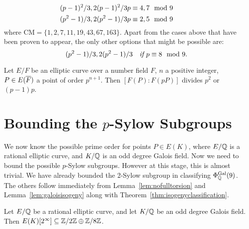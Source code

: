\begin{thm}
\begin{align}
	\pushleft{(p - 1)^2/3, 2(p - 1)^2/3} &  \pushright{p \equiv 4, 7 \mod 9 \quad\quad\quad} \label{12} \\
	\pushleft{(p^2 - 1)/3, 2(p^2 - 1)/3} &  \pushright{p \equiv 2, 5 \mod 9 \quad\quad\quad} \label{13}
	\end{align}
where $\text{CM}= \{ 1, 2, 7, 11, 19, 43, 67, 163 \}$. Apart from the cases above that have been proven to appear, the only other options that might be possible are:
	\begin{equation} \label{14}
	(p^2 - 1)/3, 2(p^2 - 1)/3 \quad \text{\itshape if } p \equiv 8 \mod 9.
	\end{equation}
\end{thm}


\begin{thm} \label{thm:fielddefdiv}
Let $E/F$ be an elliptic curve over a number field $F$, $n$ a positive integer, $P \in E(\overline{F})$ a point of order $p^{n+1}$. Then $[F(P) \colon F(pP)]$ divides $p^2$ or $(p - 1)p$.
\end{thm}


\section{Bounding the $p$-Sylow Subgroups}

We now know the possible prime order for points $P \in E(K)$, where $E/\mathbb{Q}$ is a rational elliptic curve, and $K/\mathbb{Q}$ is an odd degree Galois field. Now we need to bound the possible $p$-Sylow subgroups. However at this stage, this is almost trivial. We have already bounded the 2-Sylow subgroup in classifying $\Phi_{\mathbb{Q}}^{\operatorname{Gal}}(9)$. The others follow immediately from Lemma~\ref{lem:nofulltorsion} and Lemma~\ref{lem:galoisisogeny} along with Theorem~\ref{thm:isogenyclassification}.


\begin{lem} \label{lem:2oddbound}
Let $E/\mathbb{Q}$ be a rational elliptic curve, and let $K/\mathbb{Q}$ be an odd degree Galois field. Then $E(K)[2^\infty] \subseteq \mathbb{Z}/2\mathbb{Z} \oplus \mathbb{Z}/8\mathbb{Z}$. 
\end{lem}

